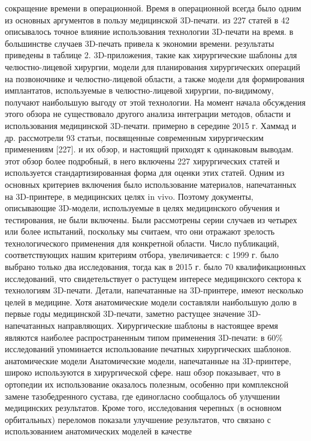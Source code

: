 сокращение времени в операционной. Время в операционной всегда было одним из
основных аргументов в пользу медицинской 3D-печати. из 227 статей в 42
описывалось точное влияние использования технологии 3D-печати на время. в
большинстве случаев 3D-печать привела к экономии времени. результаты приведены в
таблице 2. 3D-приложения, такие как хирургические шаблоны для челюстно-лицевой
хирургии, модели для планирования хирургических операций на позвоночнике и
челюстно-лицевой области, а также модели для формирования имплантатов,
используемые в челюстно-лицевой хирургии, по-видимому, получают наибольшую
выгоду от этой технологии. На момент начала обсуждения этого обзора не
существовало другого анализа интеграции методов, области и использования
медицинской 3D-печати. примерно в середине 2015 г. Хаммад и др. рассмотрели 93
статьи, посвященные современным хирургическим применениям [227]. и их обзор, и
настоящий приходят к одинаковым выводам. этот обзор более подробный, в него
включены 227 хирургических статей и используется стандартизированная форма для
оценки этих статей. Одним из основных критериев включения было использование
материалов, напечатанных на 3D-принтере, в медицинских целях in vivo. Поэтому
документы, описывающие 3D-модели, используемые в целях медицинского обучения и
тестирования, не были включены. Были рассмотрены серии случаев из четырех или
более испытаний, поскольку мы считаем, что они отражают зрелость
технологического применения для конкретной области. Число публикаций,
соответствующих нашим критериям отбора, увеличивается: с 1999 г. было выбрано
только два исследования, тогда как в 2015 г. было 70 квалификационных
исследований, что свидетельствует о растущем интересе медицинского сектора к
технологиям 3D-печати. Детали, напечатанные на 3D-принтере, имеют несколько
целей в медицине. Хотя анатомические модели составляли наибольшую долю в первые
годы медицинской 3D-печати, заметно растущее значение 3D-напечатанных
направляющих. Хирургические шаблоны в настоящее время являются наиболее
распространенным типом применения 3D-печати: в 60\% исследований упоминается
использование печатных хирургических шаблонов. анатомические модели
Анатомические модели, напечатанные на 3D-принтере, широко используются в
хирургической сфере. наш обзор показывает, что в ортопедии их использование
оказалось полезным, особенно при комплексной замене тазобедренного сустава, где
единогласно сообщалось об улучшении медицинских результатов. Кроме того,
исследования черепных (в основном орбитальных) переломов показали улучшение
результатов, что связано с использованием анатомических моделей в качестве

